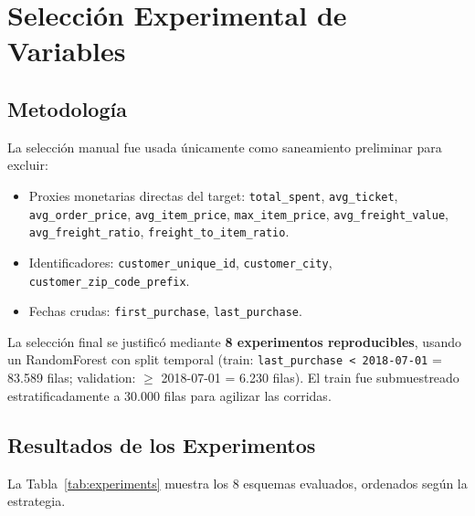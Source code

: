 \documentclass[journal,letterpaper]{IEEEtran}
\begin{document}
\section{Selección Experimental de Variables}
\subsection{Metodología}
La selección manual fue usada únicamente como saneamiento preliminar para excluir:
\begin{itemize}
    \item Proxies monetarias directas del target: \texttt{total\_spent}, \texttt{avg\_ticket}, \texttt{avg\_order\_price}, \texttt{avg\_item\_price}, \texttt{max\_item\_price}, \texttt{avg\_freight\_value}, \texttt{avg\_freight\_ratio}, \texttt{freight\_to\_item\_ratio}.
    \item Identificadores: \texttt{customer\_unique\_id}, \texttt{customer\_city}, \texttt{customer\_zip\_code\_prefix}.
    \item Fechas crudas: \texttt{first\_purchase}, \texttt{last\_purchase}.
\end{itemize}

La selección final se justificó mediante \textbf{8 experimentos reproducibles}, usando un RandomForest con split temporal (train: \texttt{last\_purchase < 2018-07-01} = 83.589 filas; validation: $\geq$ 2018-07-01 = 6.230 filas). El train fue submuestreado estratificadamente a 30.000 filas para agilizar las corridas.

\subsection{Resultados de los Experimentos}
La Tabla~\ref{tab:experiments} muestra los 8 esquemas evaluados, ordenados según la estrategia.
\end{document}
